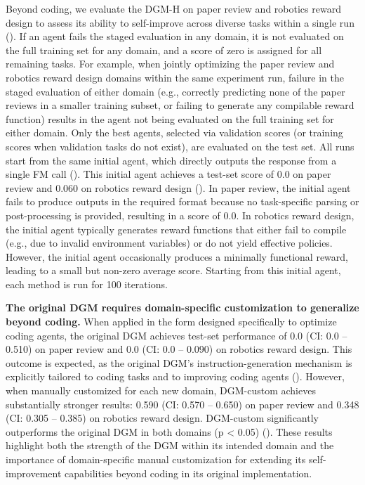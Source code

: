\documentclass[]{fairmeta}
\begin{document}
Beyond coding, we evaluate the DGM-H on paper review and robotics reward design to assess its ability to self-improve across diverse tasks within a single run (). If an agent fails the staged evaluation in any domain, it is not evaluated on the full training set for any domain, and a score of zero is assigned for all remaining tasks. For example, when jointly optimizing the paper review and robotics reward design domains within the same experiment run, failure in the staged evaluation of either domain (e.g., correctly predicting none of the paper reviews in a smaller training subset, or failing to generate any compilable reward function) results in the agent not being evaluated on the full training set for either domain. Only the best agents, selected via validation scores (or training scores when validation tasks do not exist), are evaluated on the test set.
All runs start from the same initial agent, which directly outputs the response from a single FM call (). This initial agent achieves a test-set score of 0.0 on paper review and 0.060 on robotics reward design (). In paper review, the initial agent fails to produce outputs in the required format because no task-specific parsing or post-processing is provided, resulting in a score of 0.0. In robotics reward design, the initial agent typically generates reward functions that either fail to compile (e.g., due to invalid environment variables) or do not yield effective policies. However, the initial agent occasionally produces a minimally functional reward, leading to a small but non-zero average score. Starting from this initial agent, each method is run for 100 iterations.

\textbf{The original DGM requires domain-specific customization to generalize beyond coding.} When applied in the form designed specifically to optimize coding agents, the original DGM achieves test-set performance of 0.0 (CI: 0.0 – 0.510) on paper review and 0.0 (CI: 0.0 – 0.090) on robotics reward design. This outcome is expected, as the original DGM's instruction-generation mechanism is explicitly tailored to coding tasks and to improving coding agents (). However, when manually customized for each new domain, DGM-custom achieves substantially stronger results: 0.590 (CI: 0.570 – 0.650) on paper review and 0.348 (CI: 0.305 – 0.385) on robotics reward design. DGM-custom significantly outperforms the original DGM in both domains (p < 0.05) (). These results highlight both the strength of the DGM within its intended domain and the importance of domain-specific manual customization for extending its self-improvement capabilities beyond coding in its original implementation.
\end{document}
